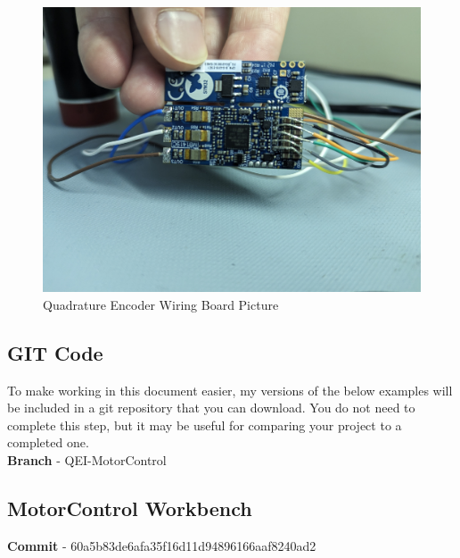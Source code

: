 \documentclass[10pt]{article}
\begin{document}
            \begin{figure}[H]
                \centerline{\includegraphics[width=\textwidth]{References/QEI Wiring Board Picture.jpg}}
                \caption{Quadrature Encoder Wiring Board Picture}
            \end{figure}
		\FloatBarrier \subsection{GIT Code}
            To make working in this document easier, my versions of the below examples will be included in a git repository that you can download. You do not need to complete this step, but it may be useful for comparing your project to a completed one. \\
            \textbf{Branch} - QEI-MotorControl
		\FloatBarrier \subsection{MotorControl Workbench}
            \textbf{Commit} - 60a5b83de6afa35f16d11d94896166aaf8240ad2 \\
\end{document}
